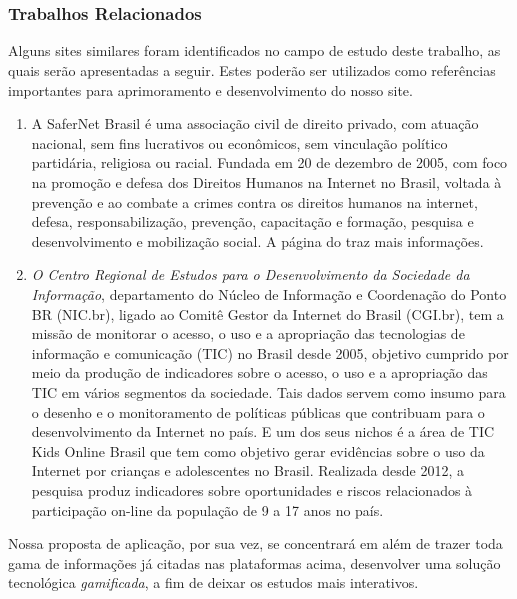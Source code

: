\chapter{}

\subsection{Trabalhos Relacionados}

Alguns sites similares foram identificados no campo de estudo deste trabalho, as quais serão apresentadas a seguir. Estes poderão ser utilizados como referências importantes para aprimoramento e desenvolvimento do nosso site.

\begin{enumerate}
    \item A SaferNet Brasil é uma associação civil de direito privado, com atuação nacional, sem fins lucrativos ou econômicos, sem vinculação político partidária, religiosa ou racial. Fundada em 20 de dezembro de 2005, com foco na promoção e defesa dos Direitos Humanos na Internet no Brasil, voltada à prevenção e ao combate a crimes contra os direitos humanos na internet, defesa, responsabilização, prevenção, capacitação e formação, pesquisa e desenvolvimento e mobilização social. A página do \cite{safernet} traz mais informações.
    
    \item \emph{O Centro Regional de Estudos para o Desenvolvimento da Sociedade da Informação}, departamento do Núcleo de Informação e Coordenação do Ponto BR (NIC.br), ligado ao Comitê Gestor da Internet do Brasil (CGI.br), tem a missão de monitorar o acesso, o uso e a apropriação das tecnologias de informação e comunicação (TIC) no Brasil desde 2005, objetivo cumprido por meio da produção de indicadores sobre o acesso, o uso e a apropriação das TIC em vários segmentos da sociedade. Tais dados servem como insumo para o desenho e o monitoramento de políticas públicas que contribuam para o desenvolvimento da Internet no país. E um dos seus nichos é a área de TIC Kids Online Brasil que tem como objetivo gerar evidências sobre o uso da Internet por crianças e adolescentes no Brasil. Realizada desde 2012, a pesquisa produz indicadores sobre oportunidades e riscos relacionados à participação on-line da população de 9 a 17 anos no país.
    
\end{enumerate}

Nossa proposta de aplicação, por sua vez, se concentrará em além de trazer toda gama de informações já citadas nas plataformas acima, desenvolver uma solução tecnológica \textit{gamificada}, a fim de deixar os estudos mais interativos.
